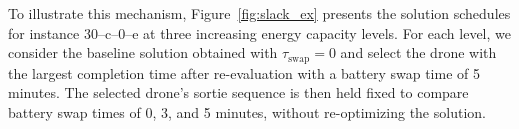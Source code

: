 \documentclass[3p, authoryear, 11pt]{elsarticle}
\begin{document}
To illustrate this mechanism, Figure~\ref{fig:slack_ex} presents the solution schedules for instance 30--c--0--e at three increasing energy capacity levels. For each level, we consider the baseline solution obtained with $\tau_{\mathrm{swap}}=0$ and select the drone with the largest completion time after re-evaluation with a battery swap time of 5 minutes. The selected drone's sortie sequence is then held fixed to compare battery swap times of 0, 3, and 5 minutes, without re-optimizing the solution.

\end{document}
